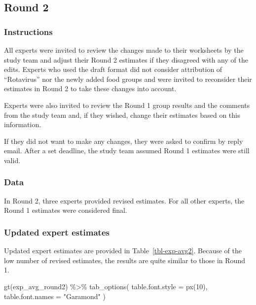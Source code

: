 \documentclass[
  letterpaper,
  DIV=11,
  numbers=noendperiod]{scrartcl}
\newenvironment{Shaded}{\begin{snugshade}}{\end{snugshade}}
\newcommand{\AttributeTok}[1]{\textcolor[rgb]{0.40,0.45,0.13}{#1}}
\newcommand{\DecValTok}[1]{\textcolor[rgb]{0.68,0.00,0.00}{#1}}
\newcommand{\FunctionTok}[1]{\textcolor[rgb]{0.28,0.35,0.67}{#1}}
\newcommand{\NormalTok}[1]{\textcolor[rgb]{0.00,0.23,0.31}{#1}}
\newcommand{\SpecialCharTok}[1]{\textcolor[rgb]{0.37,0.37,0.37}{#1}}
\newcommand{\StringTok}[1]{\textcolor[rgb]{0.13,0.47,0.30}{#1}}
\begin{document}
\subsection{Round 2}\label{round-2}

\subsubsection{Instructions}\label{instructions}

All experts were invited to review the changes made to their worksheets
by the study team and adjust their Round 2 estimates if they disagreed
with any of the edits. Experts who used the draft format did not
consider attribution of ``Rotavirus'' nor the newly added food groups
and were invited to reconsider their estimates in Round 2 to take these
changes into account.

Experts were also invited to review the Round 1 group results and the
comments from the study team and, if they wished, change their estimates
based on this information.

If they did not want to make any changes, they were asked to confirm by
reply email. After a set deadline, the study team assumed Round 1
estimates were still valid.

\subsubsection{Data}\label{data-2}

In Round 2, three experts provided revised estimates. For all other
experts, the Round 1 estimates were considered final.

\subsubsection{Updated expert estimates}\label{updated-expert-estimates}

Updated expert estimates are provided in Table~\ref{tbl-exp-avg2}.
Because of the low number of revised estimates, the results are quite
similar to those in Round 1.

\begin{Shaded}
\begin{Highlighting}[]
\FunctionTok{gt}\NormalTok{(exp\_avg\_round2) }\SpecialCharTok{\%\textgreater{}\%} 
  \FunctionTok{tab\_options}\NormalTok{(}
    \AttributeTok{table.font.style =} \FunctionTok{px}\NormalTok{(}\DecValTok{10}\NormalTok{),}
    \AttributeTok{table.font.names =} \StringTok{"Garamond"}
\NormalTok{  )}
\end{Highlighting}
\end{Shaded}
\end{document}

